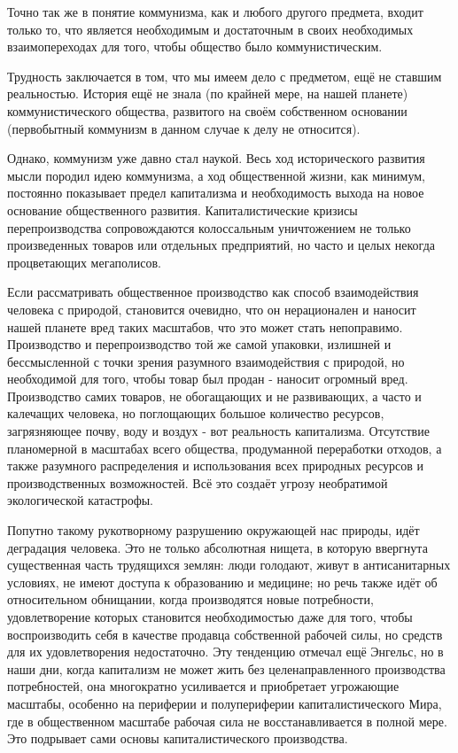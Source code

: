 \documentclass[../main]{subfiles}
\begin{document}
Точно так же в понятие коммунизма, как и любого другого предмета, входит только то, что является необходимым и достаточным в своих необходимых взаимопереходах для того, чтобы общество было коммунистическим.

Трудность заключается в том, что мы имеем дело с предметом, ещё не ставшим реальностью. История ещё не знала (по крайней мере, на нашей планете) коммунистического общества, развитого на своём собственном основании (первобытный коммунизм в данном случае к делу не относится).

Однако, коммунизм уже давно стал наукой. Весь ход исторического развития мысли породил идею коммунизма, а ход общественной жизни, как минимум, постоянно показывает предел капитализма и необходимость выхода на новое основание общественного развития. Капиталистические кризисы перепроизводства сопровождаются колоссальным уничтожением не только произведенных товаров или отдельных предприятий, но часто и целых некогда процветающих мегаполисов.

Если рассматривать общественное производство как способ взаимодействия человека с природой, становится очевидно, что он нерационален и наносит нашей планете вред таких масштабов, что это может стать непоправимо. Производство и перепроизводство той же самой упаковки, излишней и бессмысленной с точки зрения разумного взаимодействия с природой, но необходимой для того, чтобы товар был продан - наносит огромный вред. Производство самих товаров, не обогащающих и не развивающих, а часто и калечащих человека, но поглощающих большое количество ресурсов, загрязняющее почву, воду и воздух - вот реальность капитализма. Отсутствие планомерной в масштабах всего общества, продуманной переработки отходов, а также разумного распределения и использования всех природных ресурсов и производственных возможностей. Всё это создаёт угрозу необратимой экологической катастрофы.

Попутно такому рукотворному разрушению окружающей нас природы, идёт деградация человека. Это не только абсолютная нищета, в которую ввергнута существенная часть трудящихся землян: люди голодают, живут в антисанитарных условиях, не имеют доступа к образованию и медицине; но речь также идёт об относительном обнищании, когда производятся новые потребности, удовлетворение которых становится необходимостью даже для того, чтобы воспроизводить себя в качестве продавца собственной рабочей силы, но средств для их удовлетворения недостаточно. Эту тенденцию отмечал ещё Энгельс, но в наши дни, когда капитализм не может жить без целенаправленного производства потребностей, она многократно усиливается и приобретает угрожающие масштабы, особенно на периферии и полупериферии капиталистического Мира, где в общественном масштабе рабочая сила не восстанавливается в полной мере. Это подрывает сами основы капиталистического производства.
\end{document}
